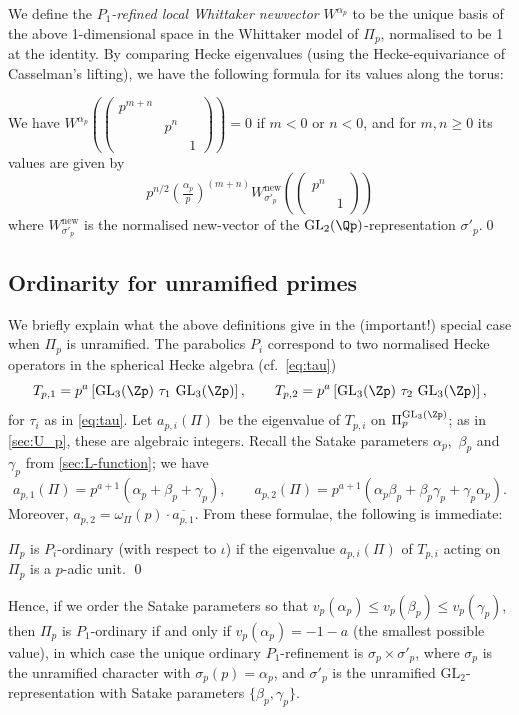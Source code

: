 \documentclass[10pt,reqno,a4paper]{amsart}
\newcommand{\stbt}[4]{\left(\begin{smallmatrix}#1 & #2\\#3&#4\end{smallmatrix}\right)}
\newcommand{\sdthree}[3]{\left(\begin{smallmatrix}#1 \\ & #2\\ && #3\end{smallmatrix}\right)}
\newcommand{\GL}{\mathrm{GL}}
\begin{document}
We define the \emph{$P_1$-refined local Whittaker newvector} $W^{\alpha_p}$ to be the unique basis of the above 1-dimensional space in the Whittaker model of $\Pi_p$, normalised to be 1 at the identity. By comparing Hecke eigenvalues (using the Hecke-equivariance of Casselman's lifting), we have the following formula for its values along the torus:

\begin{proposition}\label{prop:torusWh}
We have $W^{\alpha_p}\left(\sdthree{p^{m+n}}{p^n}{1}\right) = 0$ if $m < 0$ or $n < 0$, and for $m, n \ge 0$ its values are given by
\[
p^{n/2}\left(\tfrac{\alpha_p}{p}\right)^{(m + n)} W_{\sigma'_p}^{\mathrm{new}} \left(\stbt{p^n}{}{}{1} \right)
\]
where $W_{\sigma'_p}^{\mathrm{new}}$ is the normalised new-vector of the $\GL_2(\Qp)$-representation $\sigma'_p$.\qed
\end{proposition}


\subsection{Ordinarity for unramified primes}

We briefly explain what the above definitions give in the (important!) special case when $\Pi_p$ is unramified. The parabolics $P_i$ correspond to two normalised Hecke operators in the spherical Hecke algebra (cf.\ \eqref{eq:tau})
\begin{equation}
\label{eq:normalised hecke 1}
T_{p, 1} = p^a \left[\GL_3(\Zp)\ \tau_1\ \GL_3(\Zp)\right], \qquad
T_{p, 2} = p^{a} \left[\GL_3(\Zp) \ \tau_2 \ \GL_3(\Zp)\right],
\end{equation}
for $\tau_i$ as in \eqref{eq:tau}. Let $a_{p, i}(\Pi)$ be the eigenvalue of $T_{p,i}$ on $\Pi_p^{\GL_3(\Zp)}$; as in \cref{sec:U_p}, these are algebraic integers. Recall the Satake parameters $\alpha_p,$ $\beta_p$ and $\gamma_p$ from \cref{sec:L-function}; we have
\[
a_{p, 1}(\Pi) = p^{a+1}(\alpha_p + \beta_p + \gamma_p),\qquad a_{p, 2}(\Pi) = p^{a+1}(\alpha_p \beta_p + \beta_p \gamma_p + \gamma_p \alpha_p).
\]
Moreover, $a_{p, 2} = \omega_{\Pi}(p) \cdot \overline{a_{p, 1}}$. From these formulae, the following is immediate:

\begin{lemma}\label{def:P_i ordinary}
$\Pi_p$ is $P_i$-ordinary (with respect to $\iota$) if the eigenvalue $a_{p, i}(\Pi)$ of $T_{p, i}$ acting on $\Pi_p$ is a $p$-adic unit. \qed
\end{lemma}

Hence, if we order the Satake parameters so that $v_p(\alpha_p) \le v_p(\beta_p) \le v_p(\gamma_p)$, then $\Pi_p$ is $P_1$-ordinary if and only if $v_p(\alpha_p) = -1-a$ (the smallest possible value), in which case the unique ordinary $P_1$-refinement is $\sigma_p \times \sigma'_p$, where $\sigma_p$ is the unramified character with $\sigma_p(p) = \alpha_p$, and $\sigma'_p$ is the unramified $\GL_2$-representation with Satake parameters $\{\beta_p, \gamma_p\}$.
\end{document}
